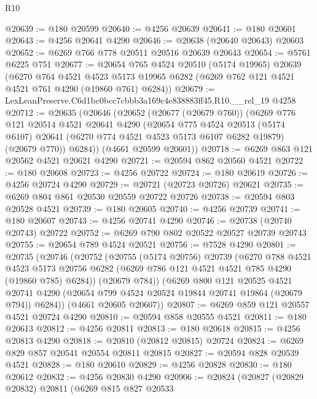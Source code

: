 \begin{lexlean}{R10}
\begin{coremodule}
@20639 := @180 @20599
@20640 := @4256 @20639
@20641 := @180 @20601
@20643 := @4256 @20641 @4290
@20646 := @20638 (@20640 @20643) @20603
@20652 := @6269 @766 @778 @20511 @20516 @20639 @20643
@20654 := @5761 @6225 @751
@20677 := @20654
    @765
    @4524
    @20510
    (@5174 @19965)
    @20639
    (@6270
      @764
      @4521
      @4523
      @5173
      @19965
      @6282
      (@6269 @762 @121 @4521 @4521 @761 @4290 (@19860 @761) @6284))
@20679 := LexLeanPreserve.C6d1bc0bcc7cbbb3a169c4e838883ff45.R10.__rel_19 @4258
@20712 := @20635
    (@20646
      (@20652
        (@20677 (@20679 @760))
        (@6269
          @776
          @121
          @20514
          @4521
          @20641
          @4290
          (@20654
            @775
            @4524
            @20513
            (@5174 @6107)
            @20641
            (@6270 @774 @4521 @4523 @5173 @6107 @6282 @19879)
            (@20679 @770))
          @6284))
      (@4661 @20599 @20601))
@20718 := @6269 @863 @121 @20562 @4521 @20621 @4290
@20721 := @20594 @862 @20560 @4521
@20722 := @180 @20608
@20723 := @4256 @20722
@20724 := @180 @20619
@20726 := @4256 @20724 @4290
@20729 := @20721 (@20723 @20726) @20621
@20735 := @6269 @804 @861 @20530 @20559 @20722 @20726
@20738 := @20594 @803 @20528 @4521
@20739 := @180 @20605
@20740 := @4256 @20739
@20741 := @180 @20607
@20743 := @4256 @20741 @4290
@20746 := @20738 (@20740 @20743) @20722
@20752 := @6269 @790 @802 @20522 @20527 @20739 @20743
@20755 := @20654 @789 @4524 @20521
@20756 := @7528 @4290
@20801 := @20735
    (@20746
      (@20752
        (@20755
          (@5174 @20756)
          @20739
          (@6270
            @788
            @4521
            @4523
            @5173
            @20756
            @6282
            (@6269 @786 @121 @4521 @4521 @785 @4290 (@19860 @785) @6284))
          (@20679 @784))
        (@6269
          @800
          @121
          @20525
          @4521
          @20741
          @4290
          (@20654 @799 @4524 @20524 @19844 @20741 @19864 (@20679 @794))
          @6284))
      (@4661 @20605 @20607))
@20807 := @6269 @859 @121 @20557 @4521 @20724 @4290
@20810 := @20594 @858 @20555 @4521
@20811 := @180 @20613
@20812 := @4256 @20811
@20813 := @180 @20618
@20815 := @4256 @20813 @4290
@20818 := @20810 (@20812 @20815) @20724
@20824 := @6269 @829 @857 @20541 @20554 @20811 @20815
@20827 := @20594 @828 @20539 @4521
@20828 := @180 @20610
@20829 := @4256 @20828
@20830 := @180 @20612
@20832 := @4256 @20830 @4290
@20906 := @20824
    (@20827
      (@20829 @20832)
      @20811
      (@6269
        @815
        @827
        @20533

\end{coremodule}
\end{lexlean}
